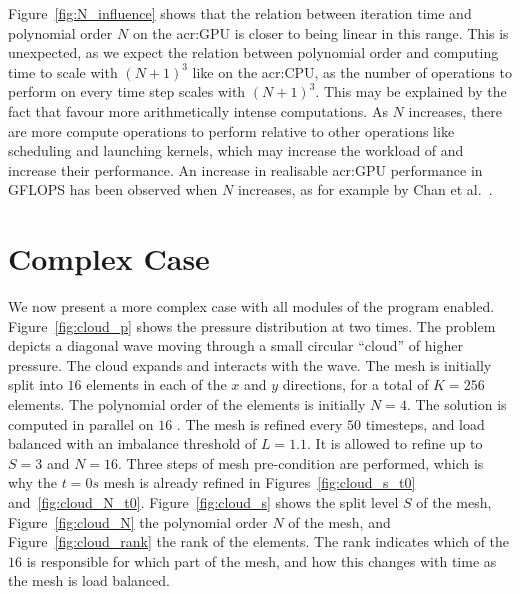 Figure~\ref{fig:N_influence} shows that the relation between iteration time and polynomial order
\(N\) on the \acrshort{acr:GPU} is closer to being linear in this range. This is unexpected, as we
expect the relation between polynomial order and computing time to scale with \({\left( N + 1
\right)}^3\) like on the \acrshort{acr:CPU}, as the number of operations to perform on every time
step scales with \({\left( N + 1 \right)}^3\). This may be explained by the fact that
 favour more arithmetically intense computations. As \(N\) increases, there are
more compute operations to perform relative to other operations like scheduling and launching
kernels, which may increase the workload of  and increase their performance. An
increase in realisable \acrshort{acr:GPU} performance in GFLOPS has been observed when \(N\)
increases, as for example by Chan et al.~\cite{Chan2016}.

\section{Complex Case}\label{section:results:complex_application}

We now present a more complex case with all modules of the program enabled. Figure~\ref{fig:cloud_p}
shows the pressure distribution at two times. The problem depicts a diagonal wave moving through a
small circular ``cloud'' of higher pressure. The cloud expands and interacts with the wave. The mesh
is initially split into \(16\) elements in each of the \(x\) and \(y\) directions, for a total of
\(K = 256\) elements. The polynomial order of the elements is initially \(N = 4\). The solution is
computed in parallel on \(16\) . The mesh is refined every \(50\) timesteps, and
load balanced with an imbalance threshold of \(L = 1.1\). It is allowed to refine up to \(S = 3\)
and \(N = 16\). Three steps of mesh pre-condition are performed, which is why the \(t = 0 s\) mesh
is already refined in Figures~\ref{fig:cloud_s_t0} and~\ref{fig:cloud_N_t0}.
Figure~\ref{fig:cloud_s} shows the split level \(S\) of the mesh, Figure~\ref{fig:cloud_N} the
polynomial order \(N\) of the mesh, and Figure~\ref{fig:cloud_rank} the rank of the elements. The
rank indicates which of the \(16\)  is responsible for which part of the mesh,
and how this changes with time as the mesh is load balanced.

